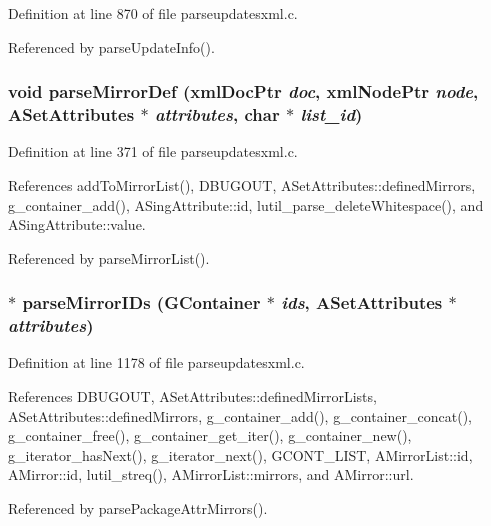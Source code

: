 Definition at line 870 of file parseupdatesxml.c.

Referenced by parse\-Update\-Info().
\subsubsection{\setlength{\rightskip}{0pt plus 5cm}void parse\-Mirror\-Def (xml\-Doc\-Ptr {\em doc}, xml\-Node\-Ptr {\em node}, {\bf ASet\-Attributes} $\ast$ {\em attributes}, char $\ast$ {\em list\_\-id})\hspace{0.3cm}{\tt  [static]}}\label{parseupdatesxml_8c_a8}




Definition at line 371 of file parseupdatesxml.c.

References add\-To\-Mirror\-List(), DBUGOUT, ASet\-Attributes::defined\-Mirrors, g\_\-container\_\-add(), ASing\-Attribute::id, lutil\_\-parse\_\-delete\-Whitespace(), and ASing\-Attribute::value.

Referenced by parse\-Mirror\-List().
\subsubsection{ $\ast$ parse\-Mirror\-IDs ({\bf GContainer} $\ast$ {\em ids}, {\bf ASet\-Attributes} $\ast$ {\em attributes})\hspace{0.3cm}{\tt  [static]}}\label{parseupdatesxml_8c_a25}




Definition at line 1178 of file parseupdatesxml.c.

References DBUGOUT, ASet\-Attributes::defined\-Mirror\-Lists, ASet\-Attributes::defined\-Mirrors, g\_\-container\_\-add(), g\_\-container\_\-concat(), g\_\-container\_\-free(), g\_\-container\_\-get\_\-iter(), g\_\-container\_\-new(), g\_\-iterator\_\-has\-Next(), g\_\-iterator\_\-next(), GCONT\_\-LIST, AMirror\-List::id, AMirror::id, lutil\_\-streq(), AMirror\-List::mirrors, and AMirror::url.

Referenced by parse\-Package\-Attr\-Mirrors().
